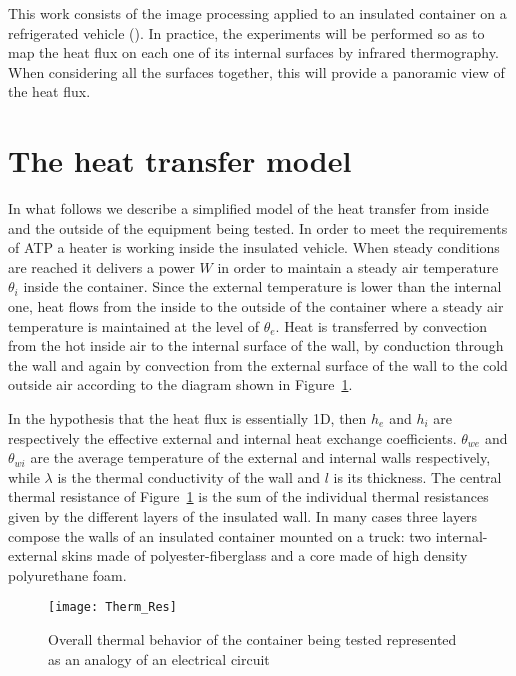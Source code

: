 \documentclass{tQRT2e}
\begin{document}
This work consists of the image processing applied to an insulated container on a refrigerated vehicle (\cite{bison1993automatic,bison2012geometrical}). In practice, the experiments will be performed so as to map the heat flux on each one of its internal surfaces by infrared thermography. When considering all the surfaces together, this will provide a panoramic view of the heat flux.


\section{The heat transfer model}

In what follows we describe a simplified model of the heat transfer from inside and the outside of the equipment being tested. In order to meet the requirements of ATP a heater is working inside the insulated vehicle. When steady conditions are reached it delivers a power $ W $ in order to maintain a steady air temperature $ \theta_i $ inside the container. Since the external temperature is lower than the internal one, heat flows from the inside to the outside of the container where a steady air temperature is maintained at the level of $ \theta_e $. Heat is transferred by convection from the hot inside air to the internal surface of the wall, by conduction through the wall and again by convection from the external surface of the wall to the cold outside air according to the diagram shown in Figure~\ref{Therm_Res}. 

In the hypothesis that the heat flux is essentially 1D,  then $ h_e $ and $ h_i $ are respectively the effective external and internal heat exchange coefficients. $ \theta_{we} $ and $ \theta_{wi} $ are the average temperature of the external and internal walls respectively, while $\lambda $ is the thermal conductivity of the wall and $l$ is its thickness. The central thermal resistance of Figure~\ref{Therm_Res} is the sum of the individual thermal resistances given by the different layers of the insulated wall. In many cases three layers compose the walls of an insulated container mounted on a truck: two internal-external skins made of polyester-fiberglass and a core made of high density polyurethane foam.
\begin{figure}[ht]
	\centering
	\texttt{[image: Therm\_Res]}
	\caption{Overall thermal behavior of the container being tested represented as an analogy of an electrical circuit}
	\label{Therm_Res}
\end{figure}
\end{document}
